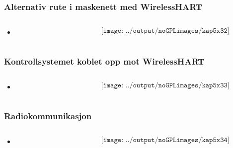 \documentclass[aspectratio=169,xcolor=dvipsnames]{beamer}
\begin{document}
\begin{frame}
	\frametitle{Alternativ rute i maskenett med WirelessHART}
	\begin{columns}
		\begin{column}{0.5\textwidth}

			\begin{itemize}
				\item      
			\end{itemize}

			
		\end{column}

		\begin{column}{0.5\textwidth}
	$$\texttt{[image: ../output/noGPLimages/kap5x32]}$$
		\end{column}
	\end{columns}
\end{frame}
\begin{frame}
	\frametitle{Kontrollsystemet koblet opp mot WirelessHART}
	\begin{columns}
		\begin{column}{0.5\textwidth}

			\begin{itemize}
				\item      
			\end{itemize}

			
		\end{column}

		\begin{column}{0.5\textwidth}
	$$\texttt{[image: ../output/noGPLimages/kap5x33]}$$
		\end{column}
	\end{columns}
\end{frame}
\begin{frame}
	\frametitle{Radiokommunikasjon}
	\begin{columns}
		\begin{column}{0.5\textwidth}

			\begin{itemize}
				\item      
			\end{itemize}

			
		\end{column}

		\begin{column}{0.5\textwidth}
	$$\texttt{[image: ../output/noGPLimages/kap5x34]}$$
		\end{column}
	\end{columns}
\end{frame}
\end{document}

